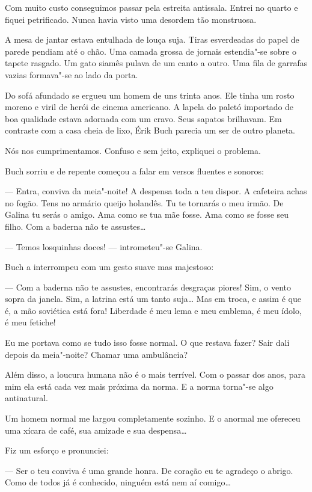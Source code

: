 Com muito custo conseguimos passar pela estreita antissala. Entrei no
quarto e fiquei petrificado. Nunca havia visto uma desordem tão
monstruosa.

A mesa de jantar estava entulhada de louça suja. Tiras esverdeadas do
papel de parede pendiam até o chão. Uma camada grossa de jornais
estendia"-se sobre o tapete rasgado. Um gato siamês pulava de um canto a
outro. Uma fila de garrafas vazias formava"-se ao lado da porta.

Do sofá afundado se ergueu um homem de uns trinta anos. Ele tinha um
rosto moreno e viril de herói de cinema americano. A lapela do paletó
importado de boa qualidade estava adornada com um cravo. Seus sapatos
brilhavam. Em contraste com a casa cheia de lixo, Érik Buch parecia um
ser de outro planeta.

Nós nos cumprimentamos. Confuso e sem jeito, expliquei o problema.

Buch sorriu e de repente começou a falar em versos fluentes e sonoros:

--- Entra, conviva da meia"-noite! A despensa toda a teu dispor. A
cafeteira achas no fogão. Tens no armário queijo holandês. Tu te
tornarás o meu irmão. De Galina tu serás o amigo. Ama como se tua mãe
fosse. Ama como se fosse seu filho. Com a baderna não te assustes\ldots{}

--- Temos losquinhas doces! --- intrometeu"-se Galina.

Buch a interrompeu com um gesto suave mas majestoso:

--- Com a baderna não te assustes, encontrarás desgraças piores! Sim, o
vento sopra da janela. Sim, a latrina está um tanto suja\ldots{} Mas em
troca, e assim é que é, a mão soviética está fora! Liberdade é meu lema
e meu emblema, é meu ídolo, é meu fetiche!

Eu me portava como se tudo isso fosse normal. O que restava fazer? Sair
dali depois da meia"-noite? Chamar uma ambulância?

Além disso, a loucura humana não é o mais terrível. Com o passar dos
anos, para mim ela está cada vez mais próxima da norma. E a norma
torna"-se algo antinatural.

Um homem normal me largou completamente sozinho. E o anormal me ofereceu
uma xícara de café, sua amizade e sua despensa\ldots{}

Fiz um esforço e pronunciei:

--- Ser o teu conviva é uma grande honra. De coração eu te agradeço o
abrigo. Como de todos já é conhecido, ninguém está nem aí comigo\ldots{}

